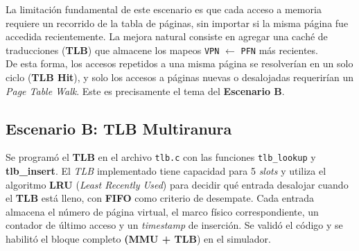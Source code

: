 \documentclass[12pt,letterpaper]{article}
\begin{document}
La limitación fundamental de este escenario es que cada acceso a memoria requiere un recorrido de la tabla de
páginas, sin importar si la misma página fue accedida recientemente. La mejora natural consiste en agregar una
caché de traducciones (\textbf{TLB}) que almacene los mapeos \texttt{VPN} $\leftarrow$ \texttt{PFN} más recientes.\\
De esta forma, los accesos repetidos a una misma página se resolverían en un solo ciclo (\textbf{TLB Hit}), y
solo los accesos a páginas nuevas o desalojadas requerirían un \textit{Page Table Walk}. Este es precisamente el
tema del \textbf{Escenario B}.

\subsection*{Escenario B: TLB Multiranura}
Se programó el \textbf{TLB} en el archivo \texttt{tlb.c} con las funciones \texttt{tlb\_lookup} y
\textbf{tlb\_insert}. El \textit{TLB} implementado tiene capacidad para 5 \textit{slots} y utiliza el algoritmo
\textbf{LRU} (\textit{Least Recently Used}) para decidir qué entrada desalojar cuando el \textbf{TLB} está lleno,
con \textbf{FIFO} como criterio de desempate. Cada entrada almacena el número de página virtual, el marco físico
correspondiente, un contador de último acceso y un \textit{timestamp} de inserción. Se validó el código y se
habilitó el bloque completo \textbf{(MMU + TLB}) en el simulador.
\end{document}
